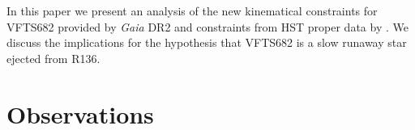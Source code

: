 \documentclass[apjl,twocolumn]{emulateapj}
\begin{document}

In this paper we present an analysis of the new kinematical
constraints for VFTS682 provided by \emph{Gaia} DR2 and constraints
from HST proper data  by \citet{platais:18}.   We discuss the
implications for the hypothesis that VFTS682 is a slow runaway star
ejected from R136.




\section{Observations}
\label{sec:sample}
\end{document}
